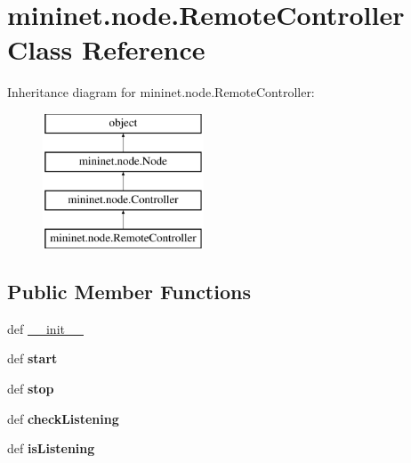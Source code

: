 \hypertarget{classmininet_1_1node_1_1RemoteController}{\section{mininet.\-node.\-Remote\-Controller Class Reference}
\label{classmininet_1_1node_1_1RemoteController}
}
Inheritance diagram for mininet.\-node.\-Remote\-Controller\-:\begin{figure}[H]
\begin{center}
\leavevmode
\includegraphics[height=4.000000cm]{classmininet_1_1node_1_1RemoteController}
\end{center}
\end{figure}
\subsection*{Public Member Functions}
\begin{DoxyCompactItemize}
\item 
def \hyperlink{classmininet_1_1node_1_1RemoteController_a132ade806efe16afd8378b6b3d8603ef}{\-\_\-\-\_\-init\-\_\-\-\_\-}
\item 
\hypertarget{classmininet_1_1node_1_1RemoteController_af04ce96293cdef74e7e3acfc1060c312}{def {\bfseries start}}\label{classmininet_1_1node_1_1RemoteController_af04ce96293cdef74e7e3acfc1060c312}

\item 
\hypertarget{classmininet_1_1node_1_1RemoteController_a423cd2c18743a69404d6a793f004dd8b}{def {\bfseries stop}}\label{classmininet_1_1node_1_1RemoteController_a423cd2c18743a69404d6a793f004dd8b}

\item 
\hypertarget{classmininet_1_1node_1_1RemoteController_a5fc4f5ec3d96e159b60f8668b880bc93}{def {\bfseries check\-Listening}}\label{classmininet_1_1node_1_1RemoteController_a5fc4f5ec3d96e159b60f8668b880bc93}

\item 
\hypertarget{classmininet_1_1node_1_1RemoteController_aee6882c7ea0a5240022526857f25e0a6}{def {\bfseries is\-Listening}}\label{classmininet_1_1node_1_1RemoteController_aee6882c7ea0a5240022526857f25e0a6}

\end{DoxyCompactItemize}

